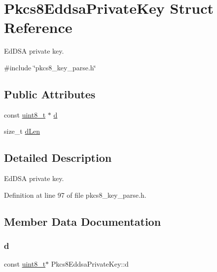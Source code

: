 \hypertarget{structPkcs8EddsaPrivateKey}{}\section{Pkcs8\+Eddsa\+Private\+Key Struct Reference}
\label{structPkcs8EddsaPrivateKey}


Ed\+D\+SA private key.  




{\ttfamily \#include \char`\"{}pkcs8\+\_\+key\+\_\+parse.\+h\char`\"{}}

\subsection*{Public Attributes}
\begin{DoxyCompactItemize}
\item 
const \hyperlink{stdint_8h_aba7bc1797add20fe3efdf37ced1182c5}{uint8\+\_\+t} $\ast$ \hyperlink{structPkcs8EddsaPrivateKey_a65e556cbe51c97815cf1b7eeb39e7683}{d}
\item 
size\+\_\+t \hyperlink{structPkcs8EddsaPrivateKey_a5806438d23d571cf0f83c4a6e2f83f98}{d\+Len}
\end{DoxyCompactItemize}


\subsection{Detailed Description}
Ed\+D\+SA private key. 

Definition at line 97 of file pkcs8\+\_\+key\+\_\+parse.\+h.



\subsection{Member Data Documentation}
\mbox{\label{structPkcs8EddsaPrivateKey_a65e556cbe51c97815cf1b7eeb39e7683}} 
\subsubsection{\texorpdfstring{d}{d}}
{\footnotesize\ttfamily const \hyperlink{stdint_8h_aba7bc1797add20fe3efdf37ced1182c5}{uint8\+\_\+t}$\ast$ Pkcs8\+Eddsa\+Private\+Key\+::d}



